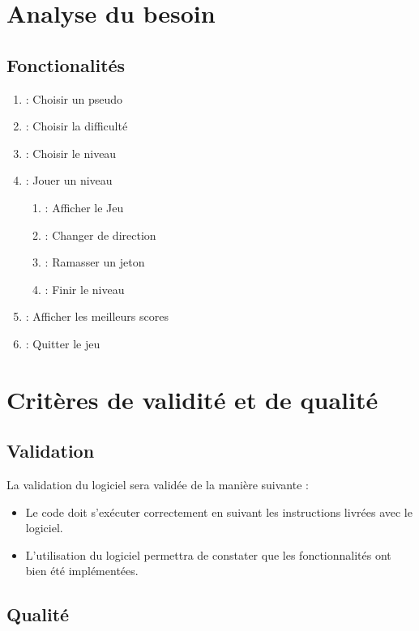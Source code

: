 \documentclass[a4paper,11pt]{scrartcl}
\begin{document}
\newpage
\section{Analyse du besoin}

\subsection{Fonctionalités}

\begin{enumerate}[label*= F\arabic*,font = \textbf]
	\item : Choisir un pseudo
	\item : Choisir la difficulté
    \item : Choisir le niveau
	\item : Jouer un niveau
    \begin{enumerate}[label*=.\arabic*,font = \textbf]
		\item : Afficher le Jeu
		\item : Changer de direction
		\item : Ramasser un jeton
		\item : Finir le niveau
    \end{enumerate}
	\item : Afficher les meilleurs scores
	\item : Quitter le jeu
\end{enumerate}
\section{Critères de validité et de qualité}

\subsection{Validation}


La validation du logiciel sera validée de la manière suivante :\\
\begin{itemize}[label = $\bullet$]
	\item Le code doit s’exécuter correctement en suivant les instructions livrées avec le logiciel.
	\item L'utilisation du logiciel permettra de constater que les fonctionnalités ont bien été implémentées.
\end{itemize}

\subsection{Qualité}
\end{document}
